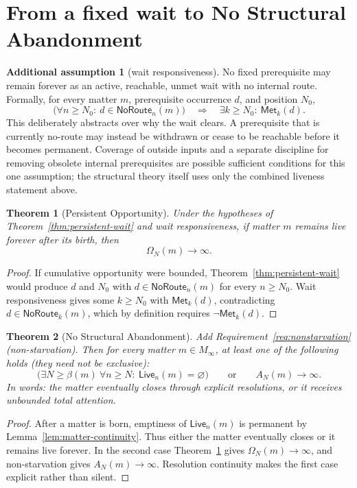 \documentclass[11pt]{article}
\newtheorem{theorem}{Theorem}
\theoremstyle{definition}
\newtheorem*{assumption}{Additional assumption}
\theoremstyle{remark}
\newcommand{\Met}{\mathsf{Met}}
\newcommand{\Live}{\mathsf{Live}}
\newcommand{\NoRoute}{\mathsf{NoRoute}}
\begin{document}
\section{From a fixed wait to No Structural Abandonment}\label{sec:nsa}

\begin{assumption}[wait responsiveness]\label{assump:wait}
No fixed prerequisite may remain forever as an active, reachable, unmet wait
with no internal route. Formally, for every matter $m$, prerequisite
occurrence $d$, and position $N_0$,
\[
 \bigl(\forall n\ge N_0:\ d\in\NoRoute_n(m)\bigr)
 \quad\Longrightarrow\quad
 \exists k\ge N_0:\ \Met_k(d).
\]
This deliberately abstracts over why the wait clears. A prerequisite that is
currently no-route may instead be withdrawn or cease to be reachable before it
becomes permanent. Coverage of outside inputs and a separate discipline for
removing obsolete internal prerequisites are possible sufficient conditions for
this one assumption; the structural theory itself uses only the combined
liveness statement above.
\end{assumption}

\begin{theorem}[Persistent Opportunity]\label{thm:persistent-opportunity}
Under the hypotheses of Theorem~\ref{thm:persistent-wait} and wait
responsiveness, if matter $m$ remains live forever after its birth, then
\[
 \Omega_N(m)\to\infty.
\]
\end{theorem}

\begin{proof}
If cumulative opportunity were bounded, Theorem~\ref{thm:persistent-wait}
would produce $d$ and $N_0$ with $d\in\NoRoute_n(m)$ for every $n\ge N_0$.
Wait responsiveness gives some $k\ge N_0$ with $\Met_k(d)$, contradicting
$d\in\NoRoute_k(m)$, which by definition requires $\neg\Met_k(d)$.
\end{proof}

\begin{theorem}[No Structural Abandonment]\label{thm:nsa}
Add Requirement~\ref{req:nonstarvation} (non-starvation). Then for every matter
$m\in M_\infty$, at least one of the following holds (they need not be
exclusive):
\[
 \bigl(\exists N\ge\beta(m)\ \forall n\ge N:\ \Live_n(m)=\varnothing\bigr)
 \qquad\text{or}\qquad
 A_N(m)\to\infty.
\]
In words: the matter eventually closes through explicit resolutions, or it
receives unbounded total attention.
\end{theorem}

\begin{proof}
After a matter is born, emptiness of $\Live_n(m)$ is permanent by
Lemma~\ref{lem:matter-continuity}. Thus either the matter eventually closes or
it remains live forever. In the second case Theorem~\ref{thm:persistent-opportunity}
gives $\Omega_N(m)\to\infty$, and non-starvation gives $A_N(m)\to\infty$.
Resolution continuity makes the first case explicit rather than silent.
\end{proof}
\end{document}
